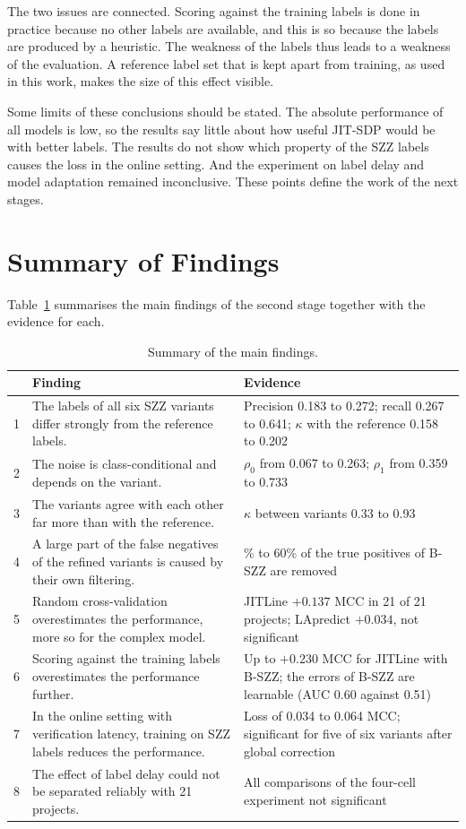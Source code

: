 \documentclass[12pt,a4paper,oneside]{report}
\newcommand{\rhoz}{\rho_0}
\newcommand{\rhoo}{\rho_1}
\begin{document}
The two issues are connected. Scoring against the training labels is done in
practice because no other labels are available, and this is so because the
labels are produced by a heuristic. The weakness of the labels thus leads to
a weakness of the evaluation. A reference label set that is kept apart from
training, as used in this work, makes the size of this effect visible.

Some limits of these conclusions should be stated. The absolute performance
of all models is low, so the results say little about how useful JIT-SDP
would be with better labels. The results do not show which property of the
SZZ labels causes the loss in the online setting. And the experiment on label
delay and model adaptation remained inconclusive. These points define the
work of the next stages.

\section{Summary of Findings}\label{sec:res-summary}

Table~\ref{tab:findings} summarises the main findings of the second stage
together with the evidence for each.

\begin{table}[htbp]
\centering\small
\caption{Summary of the main findings.}
\label{tab:findings}
\begin{tabularx}{\linewidth}{@{}r>{\raggedright\arraybackslash}X>{\raggedright\arraybackslash}X@{}}
\toprule
 & Finding & Evidence \\
\midrule
1 & The labels of all six SZZ variants differ strongly from the reference
labels. & Precision 0.183 to 0.272; recall 0.267 to 0.641; $\kappa$ with the
reference 0.158 to 0.202 \\
2 & The noise is class-conditional and depends on the variant. & $\rhoz$ from
0.067 to 0.263; $\rhoo$ from 0.359 to 0.733 \\
3 & The variants agree with each other far more than with the reference. &
$\kappa$ between variants 0.33 to 0.93 \\
4 & A large part of the false negatives of the refined variants is caused by
their own filtering. & 30\% to 60\% of the true positives of B-SZZ are
removed \\
5 & Random cross-validation overestimates the performance, more so for the
complex model. & JITLine $+0.137$ MCC in 21 of 21 projects; LApredict
$+0.034$, not significant \\
6 & Scoring against the training labels overestimates the performance
further. & Up to $+0.230$ MCC for JITLine with B-SZZ; the errors of B-SZZ are
learnable (AUC 0.60 against 0.51) \\
7 & In the online setting with verification latency, training on SZZ labels
reduces the performance. & Loss of 0.034 to 0.064 MCC; significant for five
of six variants after global correction \\
8 & The effect of label delay could not be separated reliably with 21
projects. & All comparisons of the four-cell experiment not significant \\
\bottomrule
\end{tabularx}
\end{table}
\end{document}
